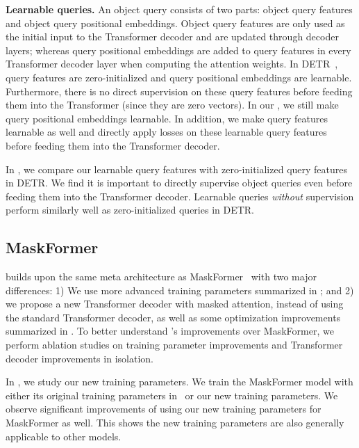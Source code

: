 \noindent\textbf{Learnable queries.}
An object query consists of two parts: object query features and object query positional embeddings. Object query features are only used as the initial input to the Transformer decoder and are updated through decoder layers; whereas query positional embeddings are added to query features in every Transformer decoder layer when computing the attention weights. In DETR~\cite{detr}, query features are zero-initialized and query positional embeddings are learnable. Furthermore, there is no direct supervision on these query features before feeding them into the Transformer (since they are zero vectors). In our \modelname, we still make query positional embeddings learnable. In addition, we make query features learnable as well and directly apply losses on these learnable query features before feeding them into the Transformer decoder.

In , we compare our learnable query features with zero-initialized query features in DETR. We find it is important to directly supervise object queries even before feeding them into the Transformer decoder. Learnable queries \textit{without} supervision perform similarly well as zero-initialized queries in DETR.


\subsection{MaskFormer \vs \modelname}
\modelname builds upon the same meta architecture as MaskFormer~\cite{cheng2021maskformer} with two major differences: 1) We use more advanced training parameters summarized in ; and 2) we propose a new Transformer decoder with masked attention, instead of using the standard Transformer decoder, as well as some optimization improvements summarized in . To better understand \modelname's improvements over MaskFormer, we perform ablation studies on training parameter improvements and Transformer decoder improvements in isolation.

In , we study our new training parameters. We train the MaskFormer model with either its original training parameters in~\cite{cheng2021maskformer} or our new training parameters. We observe significant improvements of using our new training parameters for MaskFormer as well. This shows the new training parameters are also generally applicable to other models.


